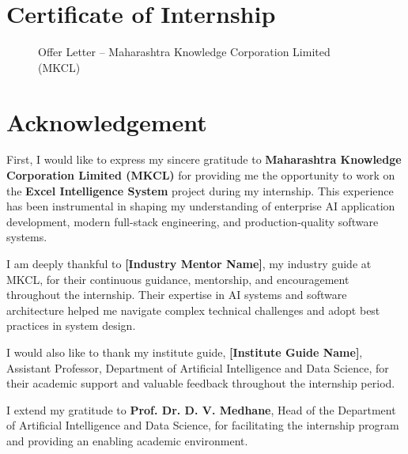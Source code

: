 \documentclass[12pt,a4paper]{report}
\begin{document}
\newpage
\chapter*{Certificate of Internship}

\begin{figure}[H]
    \centering
    \caption{Offer Letter -- Maharashtra Knowledge Corporation Limited (MKCL)}
    \label{fig:offer_letter}
\end{figure}

\newpage
\chapter*{Acknowledgement}

First, I would like to express my sincere gratitude to \textbf{Maharashtra Knowledge Corporation Limited (MKCL)} for providing me the opportunity to work on the \textbf{Excel Intelligence System} project during my internship. This experience has been instrumental in shaping my understanding of enterprise AI application development, modern full-stack engineering, and production-quality software systems.

I am deeply thankful to \textbf{[Industry Mentor Name]}, my industry guide at MKCL, for their continuous guidance, mentorship, and encouragement throughout the internship. Their expertise in AI systems and software architecture helped me navigate complex technical challenges and adopt best practices in system design.

I would also like to thank my institute guide, \textbf{[Institute Guide Name]}, Assistant Professor, Department of Artificial Intelligence and Data Science, for their academic support and valuable feedback throughout the internship period.

I extend my gratitude to \textbf{Prof. Dr. D. V. Medhane}, Head of the Department of Artificial Intelligence and Data Science, for facilitating the internship program and providing an enabling academic environment.
\end{document}
